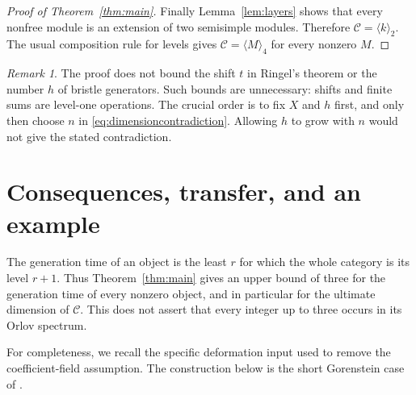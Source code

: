 \documentclass[11pt]{article}
\theoremstyle{definition}\newtheorem{definition}[theorem]{Definition}
\theoremstyle{remark}\newtheorem{remark}[theorem]{Remark}
\newcommand{\C}{\mathcal C}
\begin{document}
\begin{proof}[Proof of Theorem~\ref{thm:main}]
Finally Lemma~\ref{lem:layers} shows that every nonfree module is an extension of two semisimple modules. Therefore $\C=\langle k\rangle_2$. The usual composition rule for levels gives $\C=\langle M\rangle_4$ for every nonzero $M$.
\end{proof}

\begin{remark}
The proof does not bound the shift $t$ in Ringel's theorem or the number $h$ of bristle generators. Such bounds are unnecessary: shifts and finite sums are level-one operations. The crucial order is to fix $X$ and $h$ first, and only then choose $n$ in \eqref{eq:dimensioncontradiction}. Allowing $h$ to grow with $n$ would not give the stated contradiction.
\end{remark}

\section{Consequences, transfer, and an example}\label{sec:transfer}
The generation time of an object is the least $r$ for which the whole category is its level $r+1$. Thus Theorem~\ref{thm:main} gives an upper bound of three for the generation time of every nonzero object, and in particular for the ultimate dimension of $\C$. This does not assert that every integer up to three occurs in its Orlov spectrum.

For completeness, we recall the specific deformation input used to remove the coefficient-field assumption. The construction below is the short Gorenstein case of \cite[Theorems 1.1 and 1.2]{Z}.
\end{document}
